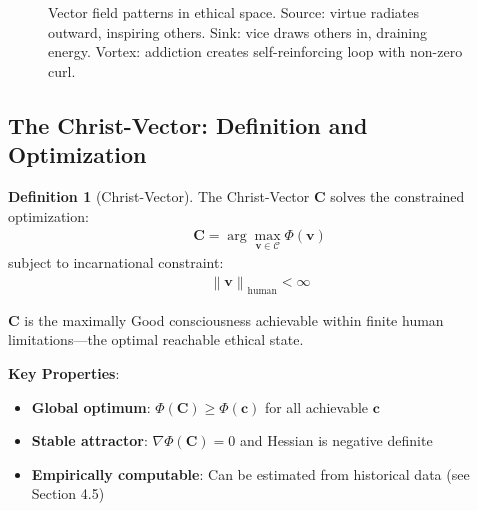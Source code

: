\documentclass[11pt,a4paper]{article}
\theoremstyle{definition}
\newtheorem{definition}{Definition}[section]
\theoremstyle{remark}
\newcommand{\CC}{\mathcal{C}}
\newcommand{\EE}{\mathbf{E}}
\newcommand{\cc}{\mathbf{c}}
\newcommand{\norm}[1]{\left\|#1\right\|}
\begin{document}
\begin{small}
\begin{figure}[H]
\caption{Vector field patterns in ethical space. Source: virtue radiates outward, inspiring others. Sink: vice draws others in, draining energy. Vortex: addiction creates self-reinforcing loop with non-zero curl.}
\label{fig:vector_field_patterns}
\end{figure}

\subsection{The Christ-Vector: Definition and Optimization}

\begin{definition}[Christ-Vector]
The Christ-Vector \(\mathbf{C}\) solves the constrained optimization:
\begin{align}
\mathbf{C} = \arg\max_{\mathbf{v} \in \CC} \Phi(\mathbf{v})
\end{align}
subject to incarnational constraint:
\begin{align}
\norm{\mathbf{v}}_{\text{human}} < \infty
\end{align}

\(\mathbf{C}\) is the maximally Good consciousness achievable within finite human limitations—the optimal reachable ethical state.

\textbf{Key Properties}:
\begin{itemize}
    \item \textbf{Global optimum}: \(\Phi(\mathbf{C}) \geq \Phi(\cc)\) for all achievable \(\cc\)
    \item \textbf{Stable attractor}: \(\nabla \Phi(\mathbf{C}) = 0\) and Hessian is negative definite
    \item \textbf{Empirically computable}: Can be estimated from historical data (see Section 4.5)
\end{itemize}
\end{definition}


\end{small}
\end{document}
